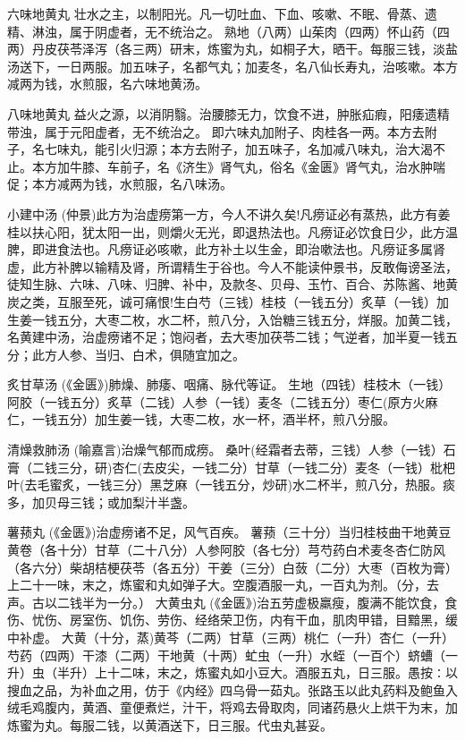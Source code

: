 \documentclass[a4paper,12pt,UTF8,twoside]{ctexbook}
\begin{document}
    六味地黄丸
    壮水之主，以制阳光。凡一切吐血、下血、咳嗽、不眠、骨蒸、遗精、淋浊，属于阴虚者，无不统治之。
    熟地（八两）山茱肉（四两）怀山药（四两）丹皮茯苓泽泻（各三两）研末，炼蜜为丸，如桐子大，晒干。每服三钱，淡盐汤送下，一日两服。加五味子，名都气丸；加麦冬，名八仙长寿丸，治咳嗽。本方减两为钱，水煎服，名六味地黄汤。
    
    八味地黄丸
    益火之源，以消阴翳。治腰膝无力，饮食不进，肿胀疝瘕，阳痿遗精带浊，属于元阳虚者，无不统治之。
    即六味丸加附子、肉桂各一两。本方去附子，名七味丸，能引火归源；本方去附子，加五味子，名加减八味丸，治大渴不止。本方加牛膝、车前子，名《济生》肾气丸，俗名《金匮》肾气丸，治水肿喘促；本方减两为钱，水煎服，名八味汤。
    
    小建中汤
    (仲景)此方为治虚痨第一方，今人不讲久矣!凡痨证必有蒸热，此方有姜桂以扶心阳，犹太阳一出，则爝火无光，即退热法也。凡痨证必饮食日少，此方温脾，即进食法也。凡痨证必咳嗽，此方补土以生金，即治嗽法也。凡痨证多属肾虚，此方补脾以输精及肾，所谓精生于谷也。今人不能读仲景书，反敢侮谤圣法，徒知生脉、六味、八味、归脾、补中，及款冬、贝母、玉竹、百合、苏陈酱、地黄炭之类，互服至死，诚可痛恨!生白芍（三钱）桂枝（一钱五分）炙草（一钱）加生姜一钱五分，大枣二枚，水二杯，煎八分，入饴糖三钱五分，烊服。加黄二钱，名黄建中汤，治虚痨诸不足；饱闷者，去大枣加茯苓二钱；气逆者，加半夏一钱五分；此方人参、当归、白术，俱随宜加之。
    
    炙甘草汤
    (《金匮》)肺燥、肺痿、咽痛、脉代等证。
    生地（四钱）桂枝木（一钱）阿胶（一钱五分）炙草（二钱）人参（一钱）麦冬（二钱五分）枣仁(原方火麻仁，一钱五分）加生姜一钱，大枣二枚，水一杯，酒半杯，煎八分服。
    
    清燥救肺汤
    (喻嘉言)治燥气郁而成痨。
    桑叶(经霜者去蒂，三钱）人参（一钱）石膏（二钱三分，研)杏仁(去皮尖，一钱二分）甘草（一钱二分）麦冬（一钱）枇杷叶(去毛蜜炙，一钱三分）黑芝麻（一钱五分，炒研)水二杯半，煎八分，热服。痰多，加贝母三钱；或加梨汁半盏。
    
    薯蓣丸
    (《金匮》)治虚痨诸不足，风气百疾。
    薯蓣（三十分）当归桂枝曲干地黄豆黄卷（各十分）甘草（二十八分）人参阿胶（各七分）芎芍药白术麦冬杏仁防风（各六分）柴胡桔梗茯苓（各五分）干姜（三分）白蔹（二分）大枣（百枚为膏）上二十一味，末之，炼蜜和丸如弹子大。空腹酒服一丸，一百丸为剂。（分，去声。古以二钱半为一分。）
    大黄虫丸
    (《金匮》)治五劳虚极羸瘦，腹满不能饮食，食伤、忧伤、房室伤、饥伤、劳伤、经络荣卫伤，内有干血，肌肉甲错，目黯黑，缓中补虚。
    大黄（十分，蒸)黄芩（二两）甘草（三两）桃仁（一升）杏仁（一升）芍药（四两）干漆（二两）干地黄（十两）虻虫（一升）水蛭（一百个）蛴螬（一升）虫（半升）上十二味，末之，炼蜜丸如小豆大。酒服五丸，日三服。愚按∶以搜血之品，为补血之用，仿于《内经》四乌骨一茹丸。张路玉以此丸药料及鲍鱼入绒毛鸡腹内，黄酒、童便煮烂，汁干，将鸡去骨取肉，同诸药悬火上烘干为末，加炼蜜为丸。每服二钱，以黄酒送下，日三服。代虫丸甚妥。
        
\end{document}
